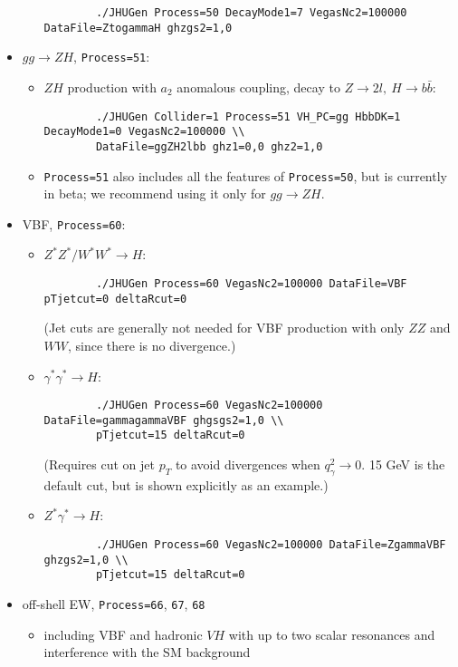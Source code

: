 \documentclass[aps,superscriptaddress,nofootinbib]{revtex4}
\begin{document}
\begin{itemize}
\begin{itemize}
\begin{verbatim}
		./JHUGen Process=50 DecayMode1=7 VegasNc2=100000 DataFile=ZtogammaH ghzgs2=1,0
		\end{verbatim}
	\end{itemize}
	\item $gg\to ZH$, \texttt{Process=51}:
	\begin{itemize}
		\item $ZH$ production with $a_2$ anomalous coupling, decay to $Z\to 2l,~H\to b\bar{b}$:
		\begin{verbatim}
		./JHUGen Collider=1 Process=51 VH_PC=gg HbbDK=1 DecayMode1=0 VegasNc2=100000 \\
		DataFile=ggZH2lbb ghz1=0,0 ghz2=1,0
		\end{verbatim}
		\item \texttt{Process=51} also includes all the features of \texttt{Process=50}, but is currently in beta; we recommend using it only for $gg\to ZH$.
	\end{itemize}
	\item VBF, \texttt{Process=60}:
	\begin{itemize}
		\item $Z^*Z^*/W^*W^*\to H$:
		\begin{verbatim}
		./JHUGen Process=60 VegasNc2=100000 DataFile=VBF pTjetcut=0 deltaRcut=0
		\end{verbatim}
		(Jet cuts are generally not needed for VBF production with only $ZZ$ and $WW$, since there is no divergence.)
		\item $\gamma^*\gamma^*\to H$:
		\begin{verbatim}
		./JHUGen Process=60 VegasNc2=100000 DataFile=gammagammaVBF ghgsgs2=1,0 \\
		pTjetcut=15 deltaRcut=0
		\end{verbatim}
		(Requires cut on jet $p_T$ to avoid divergences when $q_\gamma^2\to 0$.  15 GeV is the default cut, but is shown explicitly as an example.)
		\item $Z^*\gamma^*\to H$:
		\begin{verbatim}
		./JHUGen Process=60 VegasNc2=100000 DataFile=ZgammaVBF ghzgs2=1,0 \\
		pTjetcut=15 deltaRcut=0
		\end{verbatim}
	\end{itemize}
	\item off-shell EW, \texttt{Process=66}, \texttt{67}, \texttt{68}
	\begin{itemize}
		\item including VBF and hadronic $VH$ with up to two scalar resonances and interference with the SM background

\end{itemize}
\end{itemize}
\end{document}
